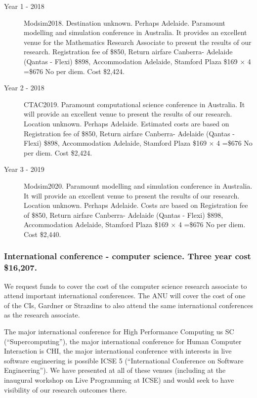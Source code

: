 \documentclass[a4paper,fontsize=12pt]{scrartcl}
\begin{document}
\begin{description}
\item[Year 1 - 2018] Modsim2018. Destination unknown. Perhaps Adelaide.
Paramount modelling and simulation conference in Australia. It provides an excellent venue for the Mathematics Research Associate to present the results of our research. 
Registration fee of \$850, 
Return airfare Canberra- Adelaide (Qantas - Flexi) \$898,
Accommodation Adelaide, Stamford Plaza \$169 $\times$ 4 =\$676
No per diem. Cost \$2,424.



\item[Year 2 - 2018] CTAC2019.
Paramount computational science conference in Australia. It will provide an excellent venue to present the results of our research. Location unknown. Perhaps Adelaide.
Estimated costs are based on 
Registration fee of \$850, 
Return airfare Canberra- Adelaide (Qantas - Flexi) \$898,
Accommodation Adelaide, Stamford Plaza \$169 $\times$ 4 =\$676
No per diem. Cost \$2,424.

\item[Year 3 - 2019] Modsim2020.
Paramount modelling and simulation conference in Australia. It will provide an excellent venue to present the results of our research. Location unknown. Perhaps Adelaide.
Costs are based on 
Registration fee of \$850, 
Return airfare Canberra- Adelaide (Qantas - Flexi) \$898,
Accommodation Adelaide, Stamford Plaza \$169 $\times$ 4 =\$676
No per diem. Cost \$2,440.




\end{description}

\subsubsection*{International conference - computer science. Three year cost \$16,207.}


We request funds to cover the cost of the computer science research associate to attend important international conferences.    
The ANU will cover the cost of one of the CIs, Gardner or Strazdins to also attend the same international conferences as the research associate. 

The major international conference for High Performance Computing us SC (``Supercomputing''), the major international conference for Human Computer Interaction is CHI, the major international conference with interests in live software engineering is possible ICSE 5 (``International Conference on Software Engineering''). We have presented at all of these venues (including at the inaugural workshop on Live Programming at ICSE) and would seek to have visibility of our research outcomes there. 
\end{document}
